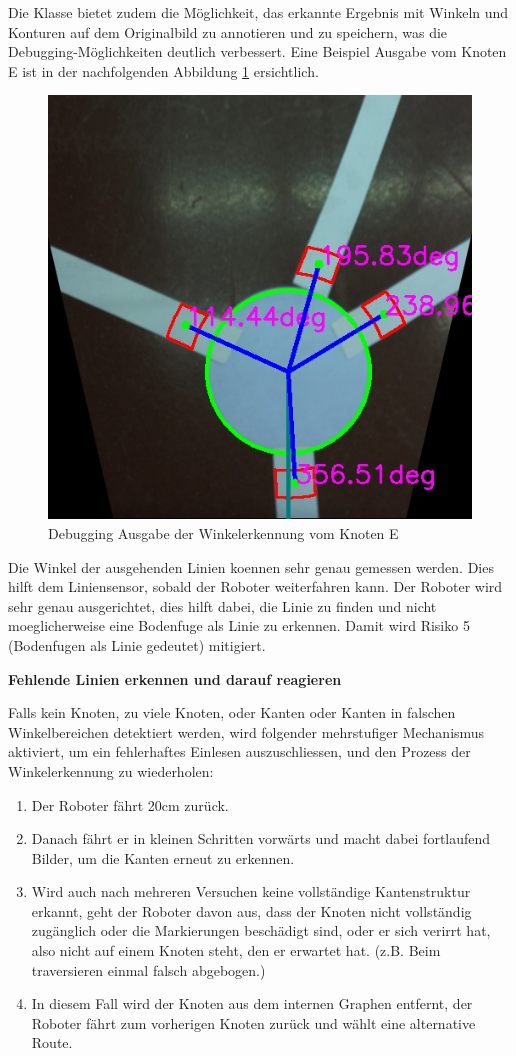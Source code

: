Die Klasse bietet zudem die Möglichkeit, das erkannte Ergebnis mit Winkeln und Konturen auf dem Originalbild zu annotieren und zu speichern, was die Debugging-Möglichkeiten deutlich verbessert. Eine Beispiel Ausgabe vom Knoten E ist in der nachfolgenden Abbildung \ref{fig:angle-reader-debug-output} ersichtlich.

\begin{figure}[H]
    \centering
    \includegraphics[width=0.5\linewidth]{assets/IT/250525_204610_test_annotated_angles_of_E.jpg}
    \caption{Debugging Ausgabe der Winkelerkennung vom Knoten E}
    \label{fig:angle-reader-debug-output}
\end{figure}

Die Winkel der ausgehenden Linien koennen sehr genau gemessen werden. Dies hilft dem Liniensensor, sobald der Roboter weiterfahren kann. Der Roboter wird sehr genau ausgerichtet, dies hilft dabei, die Linie zu finden und nicht moeglicherweise eine Bodenfuge als Linie zu erkennen. Damit wird Risiko 5 (Bodenfugen als Linie gedeutet) mitigiert.

\textbf{Fehlende Linien erkennen und darauf reagieren}

Falls kein Knoten, zu viele Knoten, oder Kanten oder Kanten in falschen Winkelbereichen detektiert werden, wird folgender mehrstufiger Mechanismus aktiviert, um ein fehlerhaftes Einlesen auszuschliessen, und den Prozess der Winkelerkennung zu wiederholen:
\begin{enumerate}
    \item Der Roboter fährt 20cm zurück.
    \item Danach fährt er in kleinen Schritten vorwärts und macht dabei fortlaufend Bilder, um die Kanten erneut zu erkennen.
    \item Wird auch nach mehreren Versuchen keine vollständige Kantenstruktur erkannt, geht der Roboter davon aus, dass der Knoten nicht vollständig zugänglich oder die Markierungen beschädigt sind, oder er sich verirrt hat, also nicht auf einem Knoten steht, den er erwartet hat. (z.B. Beim traversieren einmal falsch abgebogen.)
    \item In diesem Fall wird der Knoten aus dem internen Graphen entfernt, der Roboter fährt zum vorherigen Knoten zurück und wählt eine alternative Route.
\end{enumerate}
